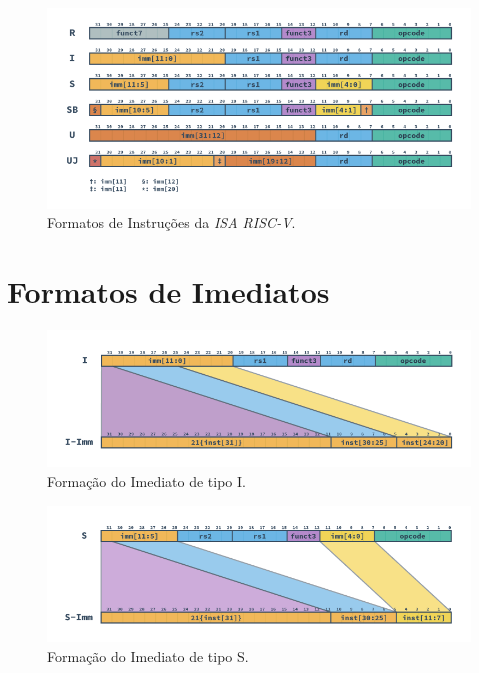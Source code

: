         \begin{figure}[H]
        \centering
            \includegraphics[width=1\linewidth]{images/RV_Formats.png}
            \caption{Formatos de Instruções da \textit{ISA RISC-V}.}\label{fig:riscv_formats}
        \end{figure}




    \section{Formatos de Imediatos}

        \begin{figure}[H]
        \centering
            \includegraphics[width=1\linewidth]{images/RV_I_Imm.png}
            \caption{Formação do Imediato de tipo I.}\label{fig:riscv_i_imm}
        \end{figure}

        \begin{figure}[H]
        \centering
            \includegraphics[width=1\linewidth]{images/RV_S_Imm.png}
            \caption{Formação do Imediato de tipo S.}\label{fig:riscv_s_imm}
        \end{figure}

